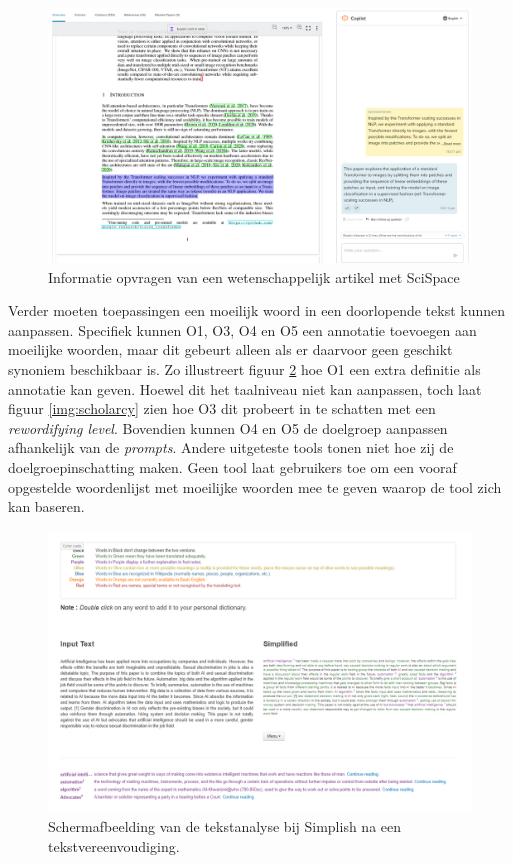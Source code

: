 \begin{figure}[H]
	\includegraphics[width=\linewidth]{img/typeset-example.png}
	\caption{Informatie opvragen van een wetenschappelijk artikel met SciSpace}
	\label{img:scispace-example}
\end{figure}

Verder moeten toepassingen een moeilijk woord in een doorlopende tekst kunnen aanpassen. Specifiek kunnen O1, O3, O4 en O5 een annotatie toevoegen aan moeilijke woorden, maar dit gebeurt alleen als er daarvoor geen geschikt synoniem beschikbaar is. Zo illustreert figuur \ref{img:simplish-output} hoe O1 een extra definitie als annotatie kan geven. Hoewel dit het taalniveau niet kan aanpassen, toch laat figuur \ref{img:scholarcy} zien hoe O3 dit probeert in te schatten met een \textit{rewordifying level}. Bovendien kunnen O4 en O5 de doelgroep aanpassen afhankelijk van de \textit{prompts}. Andere uitgeteste tools tonen niet hoe zij de doelgroepinschatting maken. Geen tool laat gebruikers toe om een vooraf opgestelde woordenlijst met moeilijke woorden mee te geven waarop de tool zich kan baseren.

\begin{figure}[H]
	\includegraphics[width=\linewidth]{img/simplish-output.png}
	\caption{Schermafbeelding van de tekstanalyse bij Simplish na een tekstvereenvoudiging.}
	\label{img:simplish-output}
\end{figure}

